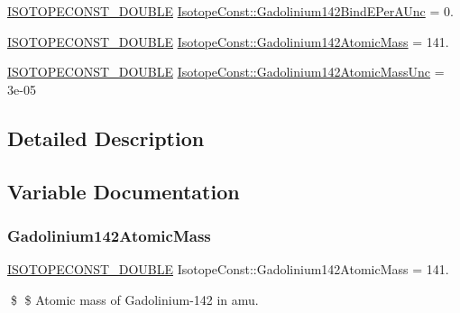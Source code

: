 \begin{DoxyCompactItemize}
\item 
\mbox{\hyperlink{group___isotope_const-_macros_ga8f45a7272ce02c0b4c65c44636ed719a}{I\+S\+O\+T\+O\+P\+E\+C\+O\+N\+S\+T\+\_\+\+D\+O\+U\+B\+LE}} \mbox{\hyperlink{group___isotope_const-_gadolinium-_gd142_gabb7617564c8e02efcedad1c4e4114df6}{Isotope\+Const\+::\+Gadolinium142\+Bind\+E\+Per\+A\+Unc}} = 0.
\item 
\mbox{\hyperlink{group___isotope_const-_macros_ga8f45a7272ce02c0b4c65c44636ed719a}{I\+S\+O\+T\+O\+P\+E\+C\+O\+N\+S\+T\+\_\+\+D\+O\+U\+B\+LE}} \mbox{\hyperlink{group___isotope_const-_gadolinium-_gd142_ga4566169bb484e911fc9d1e1c9dc91a9a}{Isotope\+Const\+::\+Gadolinium142\+Atomic\+Mass}} = 141.
\item 
\mbox{\hyperlink{group___isotope_const-_macros_ga8f45a7272ce02c0b4c65c44636ed719a}{I\+S\+O\+T\+O\+P\+E\+C\+O\+N\+S\+T\+\_\+\+D\+O\+U\+B\+LE}} \mbox{\hyperlink{group___isotope_const-_gadolinium-_gd142_ga261b50d31fdca5ababd9f71cc7a8f63f}{Isotope\+Const\+::\+Gadolinium142\+Atomic\+Mass\+Unc}} = 3e-\/05
\end{DoxyCompactItemize}


\subsection{Detailed Description}


\subsection{Variable Documentation}
\mbox{\label{group___isotope_const-_gadolinium-_gd142_ga4566169bb484e911fc9d1e1c9dc91a9a}} 
\subsubsection{\texorpdfstring{Gadolinium142\+Atomic\+Mass}{Gadolinium142AtomicMass}}
{\footnotesize\ttfamily \mbox{\hyperlink{group___isotope_const-_macros_ga8f45a7272ce02c0b4c65c44636ed719a}{I\+S\+O\+T\+O\+P\+E\+C\+O\+N\+S\+T\+\_\+\+D\+O\+U\+B\+LE}} Isotope\+Const\+::\+Gadolinium142\+Atomic\+Mass = 141.}

\$ \$ Atomic mass of Gadolinium-\/142 in amu. \mbox{\label{group___isotope_const-_gadolinium-_gd142_ga261b50d31fdca5ababd9f71cc7a8f63f}} 
